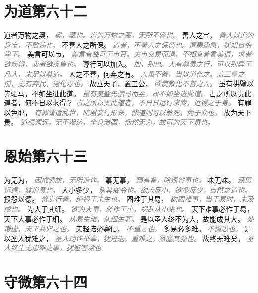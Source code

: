 \documentclass[a4paper,zihao=-4,oneside,landscape,UTF8]{ctexart}
\newcommand{\zhushi}[1]{\scriptsize{\textit{\textcolor{gray}{#1}}}\normalsize}
\begin{document}
\section{为道第六十二}

道者万物之奥，
\zhushi{奥，藏也。道为万物之藏，无所不容也。}
善人之宝，
\zhushi{善人以道为身宝，不敢违也。}
不善人之所保。
\zhushi{道者，不善人之保倚也。遭患逢急，犹知自悔卑下。}
美言可以市，
\zhushi{美言者独可于市耳。夫市交易而退，不相宜善言美语，求者欲疾得，卖者欲疾售也。}
尊行可以加入。
\zhushi{加，别也。人有尊贵之行，可以别异于凡人，未足以尊道。}
人之不善，何弃之有。
\zhushi{人虽不善，当以道化之。盖三皇之前，无有弃民，德化淳也。}
故立天子，置三公，
\zhushi{欲使教化不善之人。}
虽有拱璧以先驷马，不如坐进此道。
\zhushi{虽有美璧先驷马而至，故不如坐进此道。}
古之所以贵此道者，何不日以求得？
\zhushi{古之所以贵此道者，不日日远行求索，近得之于身。}
有罪以免耶，
\zhushi{有罪谓遭乱世，暗君妄行形诛，修道则可以解死，免于众也。}
故为天下贵。
\zhushi{道德洞远，无不覆济，全身治国，恬然无为，故可为天下贵也。}


\section{恩始第六十三}

为无为，
\zhushi{因成循故，无所造作。}
事无事，
\zhushi{预有备，除烦省事也。}
味无味。
\zhushi{深思远虑，味道意也。}
大小多少，
\zhushi{陈其戒令也。欲大反小，欲多反少，自然之道也。}
报怨以德。
\zhushi{修道行善，绝祸于未生也。}
图难于其易，
\zhushi{欲图难事，当于易时，未及成也。}
为大于其细。
\zhushi{欲为大事，必作于小，祸乱从小来也。}
天下难事必作于易，天下大事必作于细。
\zhushi{从易生难，从细生著。}
是以圣人终不为大，故能成其大。
\zhushi{处谦虚，天下共归之也。}
夫轻诺必寡信，
\zhushi{不重言也。}
多易必多难。
\zhushi{不慎患也。}
是以圣人犹难之，
\zhushi{圣人动作举事，犹进退，重难之，欲塞其源也。}
故终无难矣。
\zhushi{圣人终生无患难之事，犹避害深也}


\section{守微第六十四}
\end{document}
